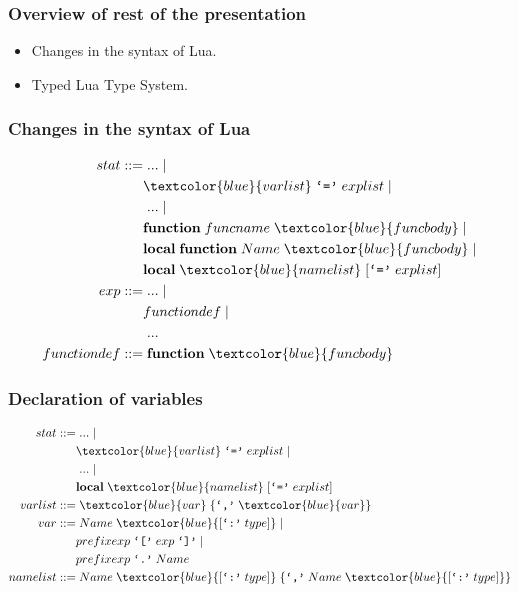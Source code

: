 \documentclass{beamer}
\begin{document}
\begin{frame}
\frametitle{Overview of rest of the presentation}
\begin{itemize}
\item Changes in the syntax of Lua.
\item Typed Lua Type System.
\end{itemize}
\end{frame}

\begin{frame}
\frametitle{Changes in the syntax of Lua}
\begin{align*}
stat ::= & \; ... \; |\\
& \textcolor{blue}{varlist} \; \texttt{`='} \; explist \; |\\
& \; ... \; |\\
& \textbf{function} \; funcname \; \textcolor{blue}{funcbody} \; |\\
& \textbf{local} \; \textbf{function} \; Name \; \textcolor{blue}{funcbody} \; |\\
& \textbf{local} \; \textcolor{blue}{namelist} \; [\texttt{`='} \; explist]\\
exp ::= & \; ... \; |\\
& functiondef \; |\\
& \; ...\\
functiondef ::= & \; \textbf{function} \; \textcolor{blue}{funcbody}
\end{align*}
\end{frame}

\begin{frame}
\frametitle{Declaration of variables}
\begin{align*}
stat ::= & \; ... \; |\\
& \textcolor{blue}{varlist} \; \texttt{`='} \; explist \; |\\
& \; ... \; |\\
& \textbf{local} \; \textcolor{blue}{namelist} \; [\texttt{`='} \; explist]\\
varlist ::= & \; \textcolor{blue}{var} \; \{\texttt{`,'} \; \textcolor{blue}{var}\}\\
var ::= & \; Name \; \textcolor{blue}{[\texttt{`:'} \; type]} \; |\\
& prefixexp \; \texttt{`['} \; exp \; \texttt{`]'} \; |\\
& prefixexp \; \texttt{`.'} \; Name\\
namelist ::= & \; Name \; \textcolor{blue}{[\texttt{`:'} \; type]} \;
\{\texttt{`,'} \; Name \; \textcolor{blue}{[\texttt{`:'} \; type]}\}
\end{align*}
\end{frame}
\end{document}
